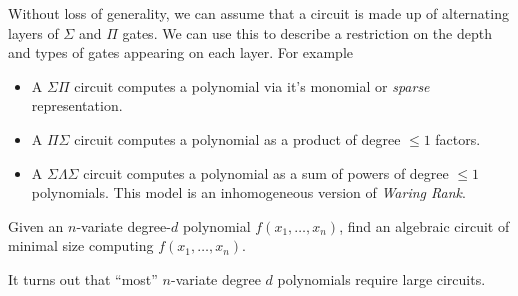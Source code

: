 \documentclass[letterpaper, 11pt]{amsart}
\newif\iffull
\begin{document}
\iffull
\clearpage
\fi

\begin{defn}\label{defn:const_depth_ckt}
  Without loss of generality, we can assume that a circuit is made up of alternating layers of $\Sigma$ and $\Pi$ gates.
  We can use this to describe a restriction on the depth and types of gates appearing on each layer.
  For example
  \begin{itemize}
  \item A $\Sigma\Pi$ circuit computes a polynomial via it's monomial or \emph{sparse} representation.
  \item A $\Pi\Sigma$ circuit computes a polynomial as a product of degree $\leq 1$ factors.
  \item A $\Sigma \Lambda \Sigma$ circuit computes a polynomial as a sum of powers of degree $\leq 1$ polynomials.
        This model is an inhomogeneous version of \emph{Waring Rank}.
  \end{itemize}
\end{defn}
\fi

\begin{defn}
  Given an $n$-variate degree-$d$ polynomial $f(x_1, \ldots, x_n)$, find an algebraic circuit of minimal size computing $f(x_1, \ldots, x_n)$.
\end{defn}

\iffull
\begin{ex}\label{ex:horner}
  Let $f(x) = \sum_{i = 0}^d a_i x^i \in \F[x]$ be a univariate polynomial.

  Then \emph{Horner's Rule} gives a recurrence for efficiently computing $f(x)$:
  \[
    p_{0}(x) = a_{0}, \qquad p_{k}(x) = a_{d - k} + x \cdot p_{k - 1}(x).
  \]
  This recurrence can be formulated as an algebraic circuit of size $\bigO{d}$ and depth $\bigO{d}$.
  In fact, this uses exactly $d$ additions and $d$ multiplications, which is optimal.
  The proof of optimality of the number of additions for computing a generic univariate polynomial $f(x)$ in this manner was given by~\cite{Ost54}.
  The corresponding proof of optimality for multiplications was given by~\cite{Pan66}.
\end{ex}
\fi

It turns out that ``most'' $n$-variate degree $d$ polynomials require large circuits.
\end{document}

